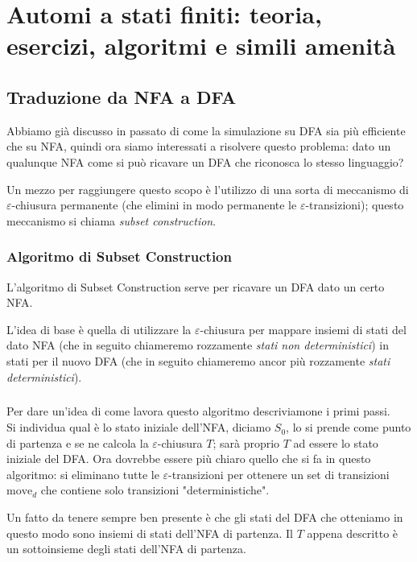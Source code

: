 \documentclass[class=book, crop=false, oneside, 12pt]{standalone}
\begin{document}
\chapter[Automi: teoria, esercizi, algoritmi e amenità]{Automi a stati finiti: teoria, esercizi, algoritmi e simili amenità}

\section{Traduzione da NFA a DFA}
Abbiamo già discusso in passato di come la simulazione su DFA sia più efficiente che su NFA, quindi ora siamo interessati a risolvere questo problema: dato un qualunque NFA come si può ricavare un DFA che riconosca lo stesso linguaggio?

Un mezzo per raggiungere questo scopo è l'utilizzo di una sorta di meccanismo di \(\varepsilon\)-chiusura permanente (che elimini in modo permanente le \(\varepsilon\)-transizioni); questo meccanismo si chiama \emph{subset construction}.


\subsection{Algoritmo di Subset Construction}
L'algoritmo di Subset Construction serve per ricavare un DFA dato un certo NFA.

L'idea di base è quella di utilizzare la \(\varepsilon\)-chiusura per mappare insiemi di stati del dato NFA (che in seguito chiameremo rozzamente \emph{stati non deterministici}) in stati per il nuovo DFA (che in seguito chiameremo ancor più rozzamente \emph{stati deterministici}).

\paragraph{}
Per dare un'idea di come lavora questo algoritmo descriviamone i primi passi.\\
Si individua qual è lo stato iniziale dell'NFA, diciamo \(S_0\), lo si prende come punto di partenza e se ne calcola la \(\varepsilon\)-chiusura \(T\); sarà proprio \(T\) ad essere lo stato iniziale del DFA. Ora dovrebbe essere più chiaro quello che si fa in questo algoritmo: si eliminano tutte le \(\varepsilon\)-transizioni per ottenere un set di transizioni \(\textrm{move}_d\) che contiene solo transizioni "deterministiche".

Un fatto da tenere sempre ben presente è che gli stati del DFA che otteniamo in questo modo sono insiemi di stati dell'NFA di partenza. Il \(T\) appena descritto è un sottoinsieme degli stati dell'NFA di partenza.
\end{document}
